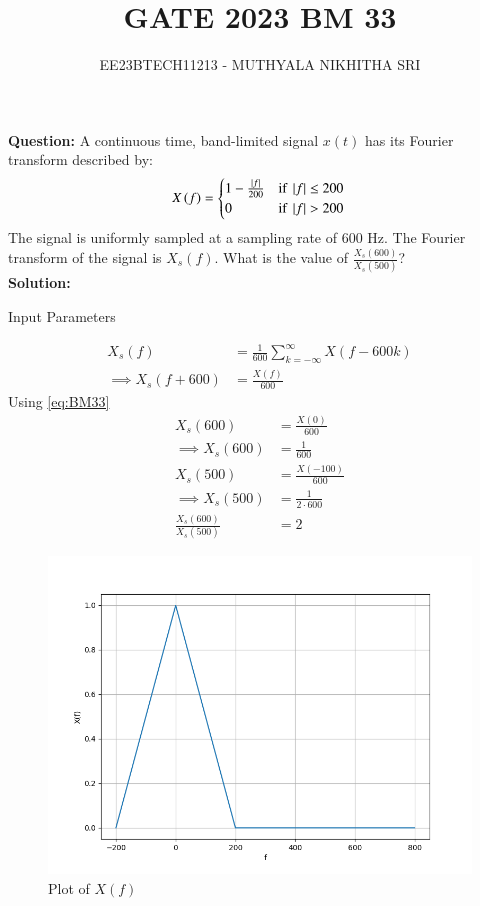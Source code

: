 \documentclass[journal,12pt,twocolumn]{IEEEtran}
\title{
	
\title{GATE 2023 BM 33}
\author{EE23BTECH11213 - MUTHYALA NIKHITHA SRI
}


}
\providecommand{\brak}[1]{\ensuremath{\left(#1\right)}}
\theoremstyle{remark}
\providecommand{\abs}[1]{\left\vert#1\right\vert}
\begin{document}
\maketitle

\textbf{Question:} 
A continuous time, band-limited signal $x\brak{t}$ has its Fourier transform described by:\\
\begin{equation}
 X\brak{f} = \begin{cases} 
1 - \frac{\abs{f}}{200} & \text{if } \abs{f} \leq 200 \\
0 & \text{if } \abs{f} > 200 \label{eq:BM33}
\end{cases}  \\
\end{equation}
The signal is uniformly sampled at a sampling rate of 600 Hz. The Fourier transform of the signal is $X_s\brak{f}$. What is the value of $\frac{X_s\brak{600}}{X_s\brak{500}}$? \\

\textbf{Solution: }
\fi

\begin{table}[h]
 	\centering
 	\resizebox{6 cm}{!}{
 		
 	}
 	\caption{Input Parameters}
    \label{tab:tablenik_33}
 \end{table}
\begin{align} 
X_s\brak{f} &= \frac{1}{600} \sum_{k=-\infty}^{\infty} X\brak{f - 600k} \\
\implies X_s\brak{f+600} &= \frac{X\brak{f}}{600} \end{align} Using \eqref{eq:BM33}
\begin{align} 
X_s\brak{600} &= \frac{X\brak{0}}{600} \\
\implies X_s\brak{600} &= \frac{1}{600} \\
X_s\brak{500} &= \frac{X\brak{-100}}{600} \\
\implies X_s\brak{500} &= \frac{1}{2\cdot 600} \\
\frac{X_s\brak{600}}{X_s\brak{500}} &= 2 
\end{align}

\begin{figure}[h!]
    \centering
    \includegraphics[width=\columnwidth]{2023/BM/33/figs/f1.png}
    \caption{Plot of $X\brak{f}$}
    \label{fig:nikhi1}
\end{figure}
\end{document}

